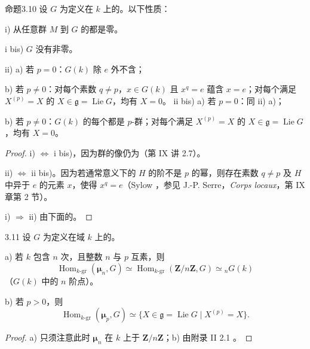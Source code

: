 \begin{SGAresult}{命题}{3.10}
设 $G$ 为定义在 $k$ 上的。以下性质：

i) 从任意群 $M$ 到 $G$ 的都是零。

i bis) $G$ 没有非零。

ii) a) 若 $p=0$：$G(k)$ 除 $e$ 外不含；

\hspace*{1em}b) 若 $p\ne0$：对每个素数 $q\ne p$，$x\in G(k)$ 且 $x^q=e$ 蕴含 $x=e$；对每个满足 $X^{(p)}=X$ 的 $X\in\mathfrak g=\operatorname{Lie}G$，均有 $X=0$。
ii bis) a) 若 $p=0$：同 ii) a)；

\hspace*{1em}b) 若 $p\ne0$：$G(k)$ 的每个都是 $p$-群；对每个满足 $X^{(p)}=X$ 的 $X\in\mathfrak g=\operatorname{Lie}G$，均有 $X=0$。
\end{SGAresult}
\begin{proof}
i) $\Leftrightarrow$ i bis)，因为群的像仍为（第 IX 讲 2.7）。

ii) $\Leftrightarrow$ ii bis)。因为若通常意义下的 $H$ 的阶不是 $p$ 的幂，则存在素数 $q\ne p$ 及 $H$ 中异于 $e$ 的元素 $x$，使得 $x^q=e$（Sylow ，参见 J.-P. Serre，\textit{Corps locaux}，第 IX 章第 2 节）。

i) $\Rightarrow$ ii) 由下面的。
\end{proof}
\begin{SGAresult}{}{3.11}
设 $G$ 为定义在域 $k$ 上的。

a) 若 $k$ 包含 $n$ 次，且整数 $n$ 与 $p$ 互素，则
\[\operatorname{Hom}_{k\text{-gr}}(\boldsymbol\mu_n,G)\simeq\operatorname{Hom}_{k\text{-gr}}(\mathbf Z/n\mathbf Z,G)\simeq{}_nG(k)\]
（$G(k)$ 中的 $n$ 阶点）。

b) 若 $p>0$，则
\[\operatorname{Hom}_{k\text{-gr}}(\boldsymbol\mu_p,G)\simeq\{X\in\mathfrak g=\operatorname{Lie}G\mid X^{(p)}=X\}.\]
\end{SGAresult}
\begin{proof}
a) 只须注意此时 $\boldsymbol\mu_n$ 在 $k$ 上于 $\mathbf Z/n\mathbf Z$；b) 由附录 II 2.1 。
\end{proof}

